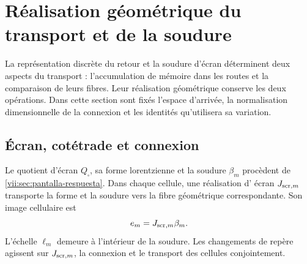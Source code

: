 
\section{Réalisation géométrique du transport et de la soudure}
\label{vii:sec:realizacion-cartan}

La représentation discrète du retour et la soudure d'écran déterminent deux aspects du transport : l'accumulation de mémoire dans les routes et la comparaison de leurs fibres. Leur réalisation géométrique conserve les deux opérations. Dans cette section sont fixés l'espace d'arrivée, la normalisation dimensionnelle de la connexion et les identités qu'utilisera sa variation.

\subsection{Écran, cotétrade et connexion}

Le quotient d'écran \(Q_\square\), sa forme lorentzienne et la
soudure \(\beta_m\) procèdent de
\ref{vii:sec:pantalla-respuesta}. Dans chaque cellule, une réalisation d'
écran \(J_{{\rm scr},m}\) transporte la forme et la soudure
vers la fibre géométrique correspondante. Son image cellulaire est
\[
 e_m=J_{{\rm scr},m}\beta_m.
\]
L'échelle \(\ell_m\) demeure à l'intérieur de la soudure. Les
changements de repère agissent sur \(J_{{\rm scr},m}\), la connexion
et le transport des cellules conjointement.

